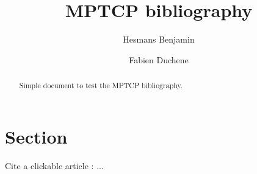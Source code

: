 \documentclass[a4paper,10pt]{article}
\title{MPTCP bibliography}
\author{Hesmans Benjamin \and Fabien Duchene}
\begin{document}
\maketitle

\begin{abstract}
Simple document to test the MPTCP bibliography.
\end{abstract}

\section{Section}

Cite a clickable article : \cite{Paasch_Mobile:2012}...



\end{document}
